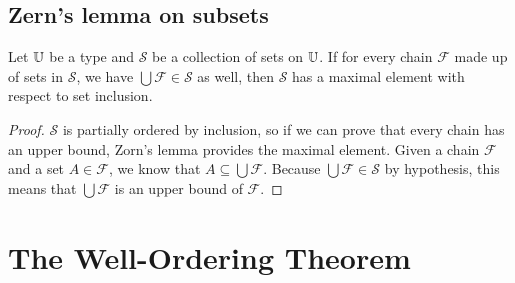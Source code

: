 \documentclass[../math.tex]{subfiles}
\begin{document}
\subsection{Zern's lemma on subsets}

\begin{theorem} \label{set-zorn}
    Let $\mathbb{U}$ be a type and $\mathcal S$ be a collection of sets on $\mathbb{U}$.  If
    for every chain $\mathcal F$ made up of sets in $\mathcal S$, we have
    $\bigcup \mathcal F \in \mathcal S$ as well, then $\mathcal S$ has a maximal
    element with respect to set inclusion.
\end{theorem}
\begin{proof}
    $\mathcal S$ is partially ordered by inclusion, so if we can prove that
    every chain has an upper bound, Zorn's lemma provides the maximal element.
    Given a chain $\mathcal F$ and a set $A \in \mathcal F$, we know that $A
    \subseteq \bigcup \mathcal F$.  Because $\bigcup \mathcal F \in \mathcal S$
    by hypothesis, this means that $\bigcup \mathcal F$ is an upper bound of
    $\mathcal F$.
\end{proof}

\section{The Well-Ordering Theorem}
\end{document}
